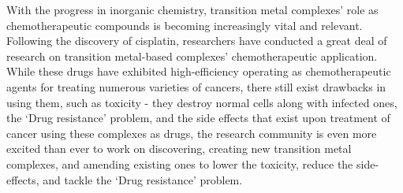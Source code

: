 With the progress in inorganic chemistry, transition metal complexes' role as chemotherapeutic compounds is becoming increasingly vital and relevant. Following the discovery of cisplatin, researchers have conducted a great deal of research on transition metal-based complexes' chemotherapeutic application. While these drugs have exhibited high-efficiency operating as chemotherapeutic agents for treating numerous varieties of cancers, there still exist drawbacks in using them, such as toxicity - they destroy normal cells along with infected ones, the `Drug resistance' problem, and the side effects that exist upon treatment of cancer using these complexes as drugs, the research community is even more excited than ever to work on discovering, creating new transition metal complexes, and amending existing ones to lower the toxicity, reduce the side-effects, and tackle the `Drug resistance' problem.
